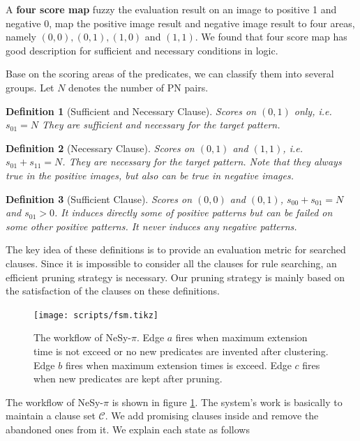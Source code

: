 \documentclass[
]{ceurart}
\newtheorem{definition}{Definition}[section]
\begin{document}
	
	A \textbf{four score map} fuzzy the evaluation result on an image to positive 1 and negative 0, map the positive image result and negative image result to four areas, namely $ (0,0), (0,1), (1,0) $ and $ (1,1) $. We found that four score map has good description for sufficient and necessary conditions in logic.
	
	Base on the scoring areas of the predicates, we can classify them into several groups. Let $ N $ denotes the number of PN pairs.
	
	\begin{definition}[Sufficient and Necessary Clause]
		Scores on $ (0,1) $ only, i.e. $ s_{01} =N$ They are sufficient and necessary for the target pattern.
	\end{definition}
	
	\begin{definition}[Necessary Clause]
		Scores on $ (0,1) $ and $ (1,1) $, i.e. $ s_{01} + s_{11} = N $. They are necessary for the target pattern. Note that they always true in the positive images, but also can be true in negative images.
	\end{definition}
	
	\begin{definition}[Sufficient Clause]
		Scores on $ (0,0) $ and $ (0,1) $, $ s_{00}+s_{01} = N $ and $ s_{01}>0 $. It induces directly some of positive patterns but can be failed on some other positive patterns. It never induces any negative patterns.
	\end{definition}
	
	The key idea of these definitions is to provide an evaluation metric for searched clauses. Since it is impossible to consider all the clauses for rule searching, an efficient pruning strategy is necessary. Our pruning strategy is mainly based on the satisfaction of the clauses on these definitions. 
	
	
	\begin{figure}[t]
		\centering
		\texttt{[image: scripts/fsm.tikz]}
		\caption{The workflow of NeSy-$ \pi $. Edge $ a $ fires when maximum extension time is not exceed or no new predicates are invented after clustering. Edge $ b $ fires when maximum extension times is exceed. Edge $ c $ fires when new predicates are kept after pruning.}
		\label{fig:nesy-pi-workflow.}
	\end{figure}
	
	The workflow of NeSy-$ \pi $ is shown in figure \ref{fig:nesy-pi-workflow.}. The system's work is basically to maintain a clause set $ \mathcal{C} $. We add promising clauses inside and remove the abandoned ones from it. We explain each state as follows
\end{document}
